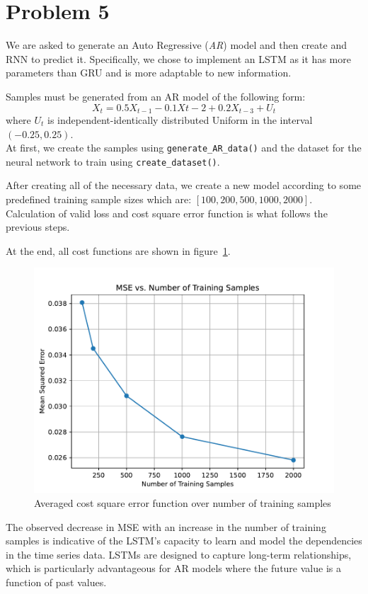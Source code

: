 \section{Problem 5}

We are asked to generate an Auto Regressive (\textit{AR}) model and then create and RNN to predict it. 
Specifically, we chose to implement an LSTM as it has more parameters than GRU and is more adaptable to new information.

Samples must be generated from an AR model of the following form:
\[
X_t = 0.5 X_{t-1} - 0.1 X{t-2} + 0.2 X_{t-3} + U_t
\]
where $U_t$ is independent-identically distributed Uniform in the interval $\left( -0.25, 0.25 \right)$.\\

At first, we create the samples using \verb|generate_AR_data()| and the dataset for the neural network to train using \verb|create_dataset()|.

After creating all of the necessary data, we create a new model according to some predefined training sample sizes which are: $\left[100, 200, 500, 1000, 2000\right]$.
Calculation of valid loss and cost square error function is what follows the previous steps.

At the end, all cost functions are shown in figure~\ref{fig:prob5_mse}.

\begin{figure}[htpb]
	\centering
	\includegraphics[width=0.5\linewidth]{../Problem 5/prob5_mse_vs_total_epoch.pdf}
	\caption{Averaged cost square error function over number of training samples}
	\label{fig:prob5_mse}
\end{figure}

The observed decrease in MSE with an increase in the number of training samples is indicative of the LSTM's capacity to learn and model the dependencies in the time series data. LSTMs are designed to capture long-term relationships, which is particularly advantageous for AR models where the future value is a function of past values.

